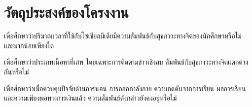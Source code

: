 \section{วัตถุประสงค์ของโครงงาน}


\begin{subitems}
    \item เพื่อศึกษาว่าปริมาณเวลาที่ใช้กับโซเชียลมีเดียมีความสัมพันธ์กับสุขภาวะทางจิตของนักศึกษาหรือไม่ และมากน้อยเพียงใด
    \item เพื่อศึกษาว่าประเภทเนื้อหาที่เสพ โดยเฉพาะการติดตามข่าวเชิงลบ สัมพันธ์กับสุขภาวะทางจิตแตกต่างกันหรือไม่
    \item เพื่อศึกษาว่าเมื่อควบคุมปัจจัยด้านการนอน การออกกำลังกาย ความกดดันจากการเรียน ผลการเรียน และความเพียงพอทางการเงินแล้ว ความสัมพันธ์ดังกล่าวยังคงอยู่หรือไม่
\end{subitems}
